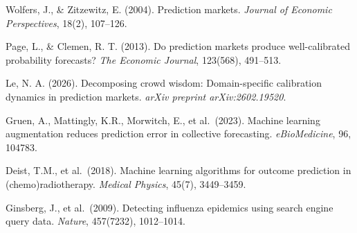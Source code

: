 \documentclass[11pt,twocolumn]{article}
\begin{document}
\begin{enumerate}[label={[\arabic*]}]
    \item Wolfers, J., \& Zitzewitz, E. (2004). Prediction markets. \textit{Journal of Economic Perspectives}, 18(2), 107--126.
    \item Page, L., \& Clemen, R. T. (2013). Do prediction markets produce well-calibrated probability forecasts? \textit{The Economic Journal}, 123(568), 491--513.
    \item Le, N. A. (2026). Decomposing crowd wisdom: Domain-specific calibration dynamics in prediction markets. \textit{arXiv preprint arXiv:2602.19520}.
    \item Gruen, A., Mattingly, K.R., Morwitch, E., et al.\ (2023). Machine learning augmentation reduces prediction error in collective forecasting. \textit{eBioMedicine}, 96, 104783.
    \item Deist, T.M., et al.\ (2018). Machine learning algorithms for outcome prediction in (chemo)radiotherapy. \textit{Medical Physics}, 45(7), 3449--3459.
    \item Ginsberg, J., et al.\ (2009). Detecting influenza epidemics using search engine query data. \textit{Nature}, 457(7232), 1012--1014.
\end{enumerate}
\end{document}

